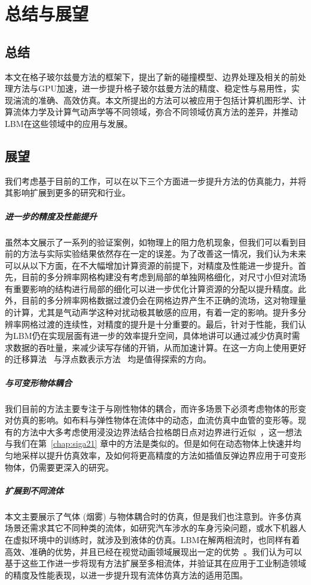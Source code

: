 \chapter{总结与展望}
\label{chap:conclusion}

\section{总结}
本文在格子玻尔兹曼方法的框架下，提出了新的碰撞模型、边界处理及相关的前处理方法与GPU加速，进一步提升格子玻尔兹曼方法的精度、稳定性与易用性，实现湍流的准确、高效仿真。本文所提出的方法可以被应用于包括计算机图形学、计算流体力学及计算气动声学等不同领域，弥合不同领域仿真方法的差异，并推动LBM在这些领域中的应用与发展。

\section{展望}
我们考虑基于目前的工作，可以在以下三个方面进一步提升方法的仿真能力，并将其影响扩展到更多的研究和行业。

\paragraph{进一步的精度及性能提升}
虽然本文展示了一系列的验证案例，如物理上的阻力危机现象，但我们可以看到目前的方法与实际实验结果依然存在一定的误差。为了改善这一情况，我们认为未来可以从以下方面，在不大幅增加计算资源的前提下，对精度及性能进一步提升。首先，目前的多分辨率网格构建没有考虑到局部的单独网格细化，对尺寸小但对流场有重要影响的结构进行局部的细化可以进一步优化计算资源的分配以提升精度。此外，目前的多分辨率网格数据过渡仍会在网格边界产生不正确的流场，这对物理量的计算，尤其是气动声学这种对扰动极其敏感的应用，有着一定的影响。提升多分辨率网格过渡的连续性，对精度的提升是十分重要的。最后，针对于性能，我们认为LBM仍在实现层面有进一步的效率提升空间，具体地讲可以通过减少仿真时需求数据的吞吐量，来减少读写存储的开销，从而加速计算。在这一方向上使用更好的迁移算法~\citep{Moritz-2022} 与浮点数表示方法~\citep{PhysRevE.106.015308} 均是值得探索的方向。

\paragraph{与可变形物体耦合} 
我们目前的方法主要专注于与刚性物体的耦合，而许多场景下必须考虑物体的形变对仿真的影响。如布料与弹性物体在流体中的动态，血流仿真中血管的变形等。现有的方法中大多考虑使用浸没边界法结合拉格朗日点对边界进行近似~\citep{doi:10.1142/S0219876221500705, WU2017103}，这一想法与我们在第~\ref{chap:siga21} 章中的方法是类似的。但是如何在动态物体上快速并均匀地采样以提升仿真效率，及如何将更高精度的方法如插值反弹边界应用于可变形物体，仍需要更深入的研究。

\paragraph{扩展到不同流体}
本文主要展示了气体 (烟雾) 与物体耦合时的仿真，但是我们也注意到。许多仿真场景还需求其它不同种类的流体，如研究汽车涉水的车身污染问题，或水下机器人在虚拟环境中的训练时，就涉及到液体的仿真。LBM在解两相流时，也同样有着高效、准确的优势，并且已经在视觉动画领域展现出一定的优势~\cite{Wei:2022, Wei:2023}。我们认为可以基于这些工作进一步将现有方法扩展至多相流体，并验证其在应用于工业制造领域的精度及性能表现，以进一步提升现有流体仿真方法的适用范围。